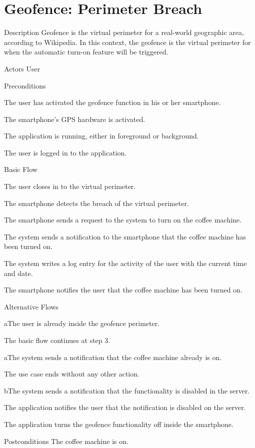 \section{Geofence: Perimeter Breach}

\begin{cpart}{Description}
Geofence is the virtual perimeter for a real-world geographic area, according to Wikipedia. In this context, the geofence is the virtual perimeter for when the automatic turn-on feature will be triggered.
\end{cpart}

\begin{cpart}{Actors}
User
\end{cpart}

\begin{cpartList}{Preconditions}
\item The user has activated the geofence function in his or her smartphone.
\item The smartphone's GPS hardware is activated.
\item The application is running, either in foreground or background.
\item The user is logged in to the application.
\end{cpartList}

\begin{cpartList}{Basic Flow}
\item The user closes in to the virtual perimeter.
\item The smartphone detects the breach of the virtual perimeter.
\item The smartphone sends a request to the system to turn on the coffee machine.
\item The system sends a notification to the smartphone that the coffee machine has been turned on.
\item The system writes a log entry for the activity of the user with the current time and date.
\item The smartphone notifies the user that the coffee machine has been turned on.
\end{cpartList}

\begin{cpartList}{Alternative Flows}
\begin{innerList}{1}{a}{The user is already inside the geofence perimeter.}
\item The basic flow continues at step 3.
\end{innerList}
\begin{innerList}{4}{a}{The system sends a notification that the coffee machine already is on.}
\item The use case ends without any other action.
\end{innerList}
\begin{innerList}{4}{b}{The system sends a notification that the functionality is disabled in the server.}
\item The application notifies the user that the notification is disabled on the server.
\item The application turns the geofence functionality off inside the smartphone.
\end{innerList}
\end{cpartList}

\begin{cpart}{Postconditions}
The coffee machine is on.
\end{cpart}
